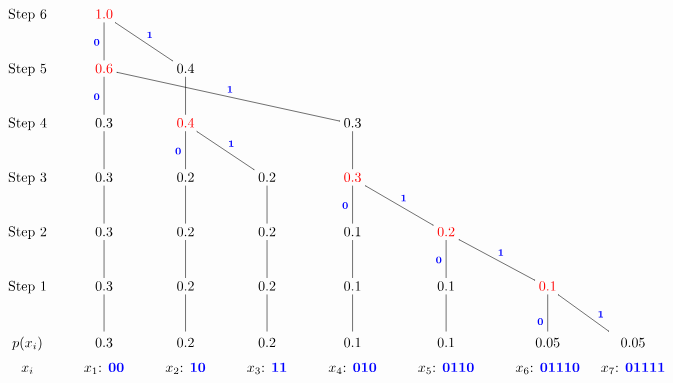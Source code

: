 \documentclass[12pt]{article}
\newcommand{\tcb}{\textcolor{blue}}
\newcommand{\tcr}{\textcolor{red}}
\begin{document}
{\begin{minipage}[t]{0.98\textwidth}
\begin{enumerate}[a)]
\begin{align*}
\xymatrixcolsep{0.4cm}
    \xymatrix{
    \text{Step 6}  & \tcr{1.0} &   &  &  &  &  & \\
    \text{Step 5}  & \tcr{0.6}\ar@{-}[u]^{\tcb{\bf0}} &  0.4\ar@{-}[ul]_{\tcb{\bf1}} &  &  &  &  & \\
    \text{Step 4}  & 0.3\ar@{-}[u]^{\tcb{\bf0}} &  \tcr{0.4}\ar@{-}[u] &   & 0.3\ar@{-}[ulll]_{\tcb{\bf1}} &  &  & \\
    \text{Step 3}  & 0.3\ar@{-}[u] &  0.2\ar@{-}[u]^{\tcb{\bf0}} & 0.2\ar@{-}[ul]_{\tcb{\bf1}} & \tcr{0.3}\ar@{-}[u] &  &  & \\
    \text{Step 2}  & 0.3\ar@{-}[u] &  0.2\ar@{-}[u] & 0.2\ar@{-}[u] & 0.1\ar@{-}[u]^{\tcb{\bf0}}  & \tcr{0.2}\ar@{-}[ul]_{\tcb{\bf1}}  &  & \\
     \text{Step 1}  & 0.3\ar@{-}[u] &  0.2\ar@{-}[u] & 0.2\ar@{-}[u] & 0.1\ar@{-}[u] & 0.1\ar@{-}[u]^{\tcb{\bf0}}  & \tcr{0.1}\ar@{-}[ul]_{\tcb{\bf1}}  & \\
     {\begin{tabular}{c} $p(x_i)$ \\[0.2cm] $x_i$ \end{tabular}} &
     {\begin{tabular}{c} 0.3 \\[0.2cm] $x_1$: \tcb{\bf00} \end{tabular}} \ar@{-}[u] &
     {\begin{tabular}{c} 0.2 \\[0.2cm] $x_2$: \tcb{\bf10} \end{tabular}} \ar@{-}[u] &
     {\begin{tabular}{c} 0.2 \\[0.2cm] $x_3$: \tcb{\bf11} \end{tabular}} \ar@{-}[u] &
     {\begin{tabular}{c} 0.1 \\[0.2cm] $x_4$: \tcb{\bf010} \end{tabular}} \ar@{-}[u] &
     {\begin{tabular}{c} 0.1 \\[0.2cm] $x_5$: \tcb{\bf0110} \end{tabular}} \ar@{-}[u] &
     {\begin{tabular}{c} 0.05 \\[0.2cm] $x_6$: \tcb{\bf01110} \end{tabular}} \ar@{-}[u]^{\tcb{\bf0}} &
     {\begin{tabular}{@{\hspace{-0.3cm}}c} 0.05 \\[0.2cm] $x_7$: \tcb{\bf01111} \end{tabular}} \ar@{-}[ul]_{\tcb{\bf1}} }

\end{align*}
\end{enumerate}
\end{minipage}}
\end{document}
